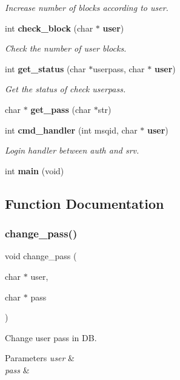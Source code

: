 \begin{DoxyCompactItemize}
\begin{DoxyCompactList}\small\item\em Increase number of blocks according to user. \end{DoxyCompactList}\item 
int \textbf{ check\+\_\+block} (char $\ast$\textbf{ user})
\begin{DoxyCompactList}\small\item\em Check the number of user blocks. \end{DoxyCompactList}\item 
int \textbf{ get\+\_\+status} (char $\ast$userpass, char $\ast$\textbf{ user})
\begin{DoxyCompactList}\small\item\em Get the status of check userpass. \end{DoxyCompactList}\item 
char $\ast$ \textbf{ get\+\_\+pass} (char $\ast$str)
\item 
int \textbf{ cmd\+\_\+handler} (int msqid, char $\ast$\textbf{ user})
\begin{DoxyCompactList}\small\item\em Login handler between auth and srv. \end{DoxyCompactList}\item 
int \textbf{ main} (void)
\end{DoxyCompactItemize}


\subsection{Function Documentation}
\mbox{\label{auth_8c_a94e83fe1538f3e714f97775e42b00843}} 
\subsubsection{change\+\_\+pass()}
{\footnotesize\ttfamily void change\+\_\+pass (\begin{DoxyParamCaption}\item[{char $\ast$}]{user,  }\item[{char $\ast$}]{pass }\end{DoxyParamCaption})}



Change user pass in DB. 


\begin{DoxyParams}{Parameters}
{\em user} & \\
\hline
{\em pass} & \\
\hline
\end{DoxyParams}
\mbox{\label{auth_8c_a4ab3ea5859f626a770d03db44f7a41aa}} 
